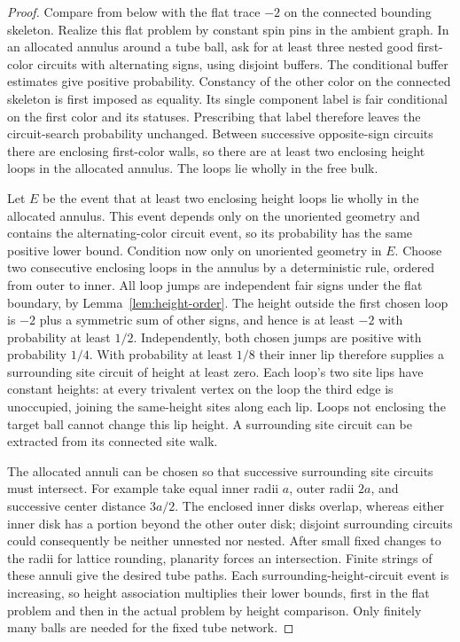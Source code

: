 \documentclass[11pt]{article}
\theoremstyle{definition}
\theoremstyle{remark}
\numberwithin{equation}{section}
\begin{document}
\begin{proof}
Compare from below with the flat trace $-2$ on the connected bounding
skeleton.  Realize this flat problem by
constant spin pins in the ambient graph.  In an allocated annulus
around a tube ball, ask for at least three nested good first-color
circuits with alternating signs, using disjoint buffers.  The
conditional buffer estimates give positive probability.  Constancy
of the other color on the connected skeleton is first imposed as
equality.  Its single component label is fair conditional on the
first color and its statuses.  Prescribing that label therefore leaves
the circuit-search probability unchanged.  Between successive
opposite-sign circuits there are enclosing first-color
walls, so there are at least two enclosing height loops in the
allocated annulus.  The loops lie wholly in the free bulk.

Let $E$ be the event that at least two enclosing height loops lie
wholly in the allocated annulus.  This event depends only on the
unoriented geometry and contains the alternating-color circuit event,
so its probability has the same positive lower bound.  Condition now
only on unoriented geometry in $E$.  Choose two consecutive enclosing
loops in the annulus by a deterministic rule, ordered from outer to
inner.  All loop jumps are
independent fair signs under the flat boundary, by
Lemma~\ref{lem:height-order}.  The height outside the first chosen
loop is $-2$ plus a symmetric sum of other signs, and hence is at
least $-2$ with probability at least $1/2$.  Independently, both
chosen jumps are positive with probability $1/4$.  With probability
at least $1/8$ their inner lip therefore supplies a surrounding
site circuit of height at least zero.  Each loop's two site lips
have constant heights: at every trivalent vertex on the loop the
third edge is unoccupied, joining the same-height sites along each
lip.  Loops not enclosing the
target ball cannot change this lip height.  A surrounding site
circuit can be extracted from its connected site walk.

The allocated annuli can be chosen so that successive surrounding
site circuits must intersect.  For example take equal inner radii
$a$, outer radii $2a$, and successive center distance $3a/2$.
The enclosed inner disks overlap, whereas either inner disk has a
portion beyond the other outer disk; disjoint surrounding circuits
could consequently be neither unnested nor nested.  After small
fixed changes to the radii for lattice rounding, planarity forces
an intersection.  Finite strings of these annuli give the desired
tube paths.  Each surrounding-height-circuit event is increasing,
so height association multiplies their lower bounds, first in the
flat problem and then in the actual problem by height comparison.
Only finitely many balls are needed for the fixed tube network.
\end{proof}
\end{document}
